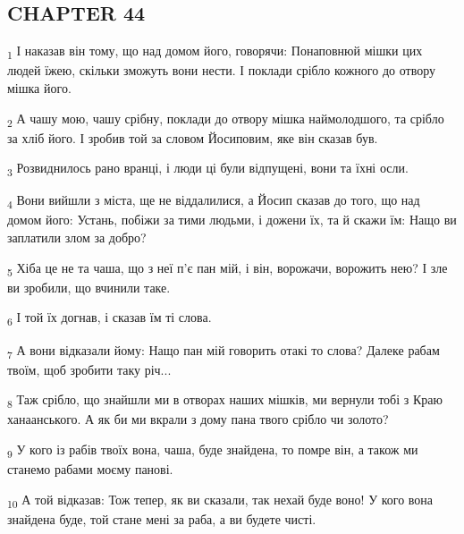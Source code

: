 \subsection{CHAPTER 44}
\begin{tcolorbox}
\textsubscript{1} І наказав він тому, що над домом його, говорячи: Понаповнюй мішки цих людей їжею, скільки зможуть вони нести. І поклади срібло кожного до отвору мішка його.
\end{tcolorbox}
\begin{tcolorbox}
\textsubscript{2} А чашу мою, чашу срібну, поклади до отвору мішка наймолодшого, та срібло за хліб його. І зробив той за словом Йосиповим, яке він сказав був.
\end{tcolorbox}
\begin{tcolorbox}
\textsubscript{3} Розвиднилось рано вранці, і люди ці були відпущені, вони та їхні осли.
\end{tcolorbox}
\begin{tcolorbox}
\textsubscript{4} Вони вийшли з міста, ще не віддалилися, а Йосип сказав до того, що над домом його: Устань, побіжи за тими людьми, і дожени їх, та й скажи їм: Нащо ви заплатили злом за добро?
\end{tcolorbox}
\begin{tcolorbox}
\textsubscript{5} Хіба це не та чаша, що з неї п'є пан мій, і він, ворожачи, ворожить нею? І зле ви зробили, що вчинили таке.
\end{tcolorbox}
\begin{tcolorbox}
\textsubscript{6} І той їх догнав, і сказав їм ті слова.
\end{tcolorbox}
\begin{tcolorbox}
\textsubscript{7} А вони відказали йому: Нащо пан мій говорить отакі то слова? Далеке рабам твоїм, щоб зробити таку річ...
\end{tcolorbox}
\begin{tcolorbox}
\textsubscript{8} Таж срібло, що знайшли ми в отворах наших мішків, ми вернули тобі з Краю ханаанського. А як би ми вкрали з дому пана твого срібло чи золото?
\end{tcolorbox}
\begin{tcolorbox}
\textsubscript{9} У кого із рабів твоїх вона, чаша, буде знайдена, то помре він, а також ми станемо рабами моєму панові.
\end{tcolorbox}
\begin{tcolorbox}
\textsubscript{10} А той відказав: Тож тепер, як ви сказали, так нехай буде воно! У кого вона знайдена буде, той стане мені за раба, а ви будете чисті.
\end{tcolorbox}

